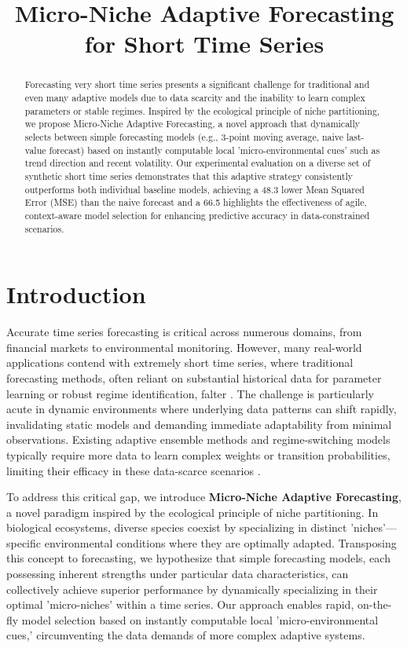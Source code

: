 \documentclass[11pt,letterpaper]{article}
\title{Micro-Niche Adaptive Forecasting for Short Time Series}
\author{} %
\date{} %
\begin{document}
\maketitle

\begin{abstract}
Forecasting very short time series presents a significant challenge for traditional and even many adaptive models due to
data scarcity and the inability to learn complex parameters or stable regimes. Inspired by the ecological principle of niche
partitioning, we propose Micro-Niche Adaptive Forecasting, a novel approach that dynamically selects between simple forecasting
models (e.g., 3-point moving average, naive last-value forecast) based on instantly computable local 'micro-environmental
cues' such as trend direction and recent volatility. Our experimental evaluation on a diverse set of synthetic short time
series demonstrates that this adaptive strategy consistently outperforms both individual baseline models, achieving a 48.3%
lower Mean Squared Error (MSE) than the naive forecast and a 66.5%
highlights the effectiveness of agile, context-aware model selection for enhancing predictive accuracy in data-constrained
scenarios.
\end{abstract}

\section{Introduction}

Accurate time series forecasting is critical across numerous domains, from financial markets to environmental monitoring. However, many real-world applications contend with extremely short time series, where traditional forecasting methods, often reliant on substantial historical data for parameter learning or robust regime identification, falter \cite{article1, article2}. The challenge is particularly acute in dynamic environments where underlying data patterns can shift rapidly, invalidating static models and demanding immediate adaptability from minimal observations. Existing adaptive ensemble methods and regime-switching models typically require more data to learn complex weights or transition probabilities, limiting their efficacy in these data-scarce scenarios \cite{article3, article4}.

To address this critical gap, we introduce \textbf{Micro-Niche Adaptive Forecasting}, a novel paradigm inspired by the ecological principle of niche partitioning. In biological ecosystems, diverse species coexist by specializing in distinct 'niches'—specific environmental conditions where they are optimally adapted. Transposing this concept to forecasting, we hypothesize that simple forecasting models, each possessing inherent strengths under particular data characteristics, can collectively achieve superior performance by dynamically specializing in their optimal 'micro-niches' within a time series. Our approach enables rapid, on-the-fly model selection based on instantly computable local 'micro-environmental cues,' circumventing the data demands of more complex adaptive systems.
\end{document}
